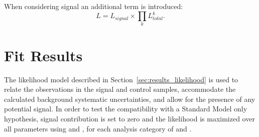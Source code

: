 When considering signal an additional term is introduced:
% 
\begin{equation}
L = L_{signal} \times \prod_k L^k_{total} .
\label{eq:total_likelihood_wsignal}
\end{equation}
% 







\section{Fit Results}  %
\label{sec:results_fit}
The likelihood model described in Section~\ref{sec:results_likelihood} is used
to relate the observations in the signal and control samples, accommodate the
calculated background systematic uncertainties, and allow for the presence of
any potential signal. In order to test the compatibility with a Standard
Model only hypothesis, signal contribution is set to zero and the likelihood is
maximized over all parameters using \ROOFIT \cite{roofit} and \MINUIT
\cite{James:1975dr}, for each analysis category of \nb and \nj.

